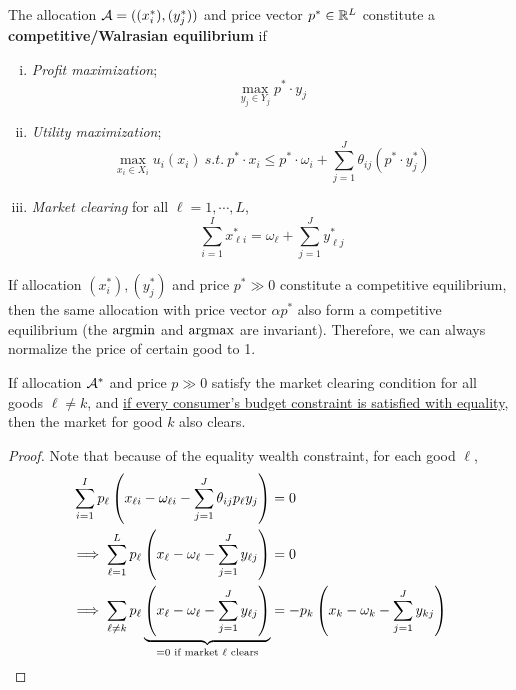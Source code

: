 \documentclass{article}
\begin{document}
	 	\begin{definition}[10.B.3]
	 		The allocation $\mathcal{{A}} = ((x_i^*), (y_j^*))$ and price vector $p^* \in \mathbb{R}^L$ constitute a \textbf{competitive/Walrasian equilibrium} if 
	 		\begin{enumerate}[(i)]
	 			\item \emph{Profit maximization};
		 			\begin{equation}
		 				\max_{y_j \in Y_j} p^* \cdot y_j
		 			\end{equation}
	 			\item \emph{Utility maximization};
	 				\begin{equation}
	 					\max_{x_i \in X_i} u_i(x_i)\ s.t.\ 
	 					p^* \cdot x_i \leq p^* \cdot \omega_i + \sum_{j=1}^J \theta_{ij} (p^* \cdot y^*_j)
	 				\end{equation}
	 			\item \emph{Market clearing} for all $\ell = 1, \cdots, L$,
	 				\begin{equation}
	 					\sum_{i=1}^I x^*_{\ell i} = \omega_\ell + \sum_{j=1}^J y^*_{\ell j}
	 				\end{equation}
	 		\end{enumerate}
	 	\end{definition}
	 	
	 	\begin{remark}
	 		If allocation $(x_i^*), (y_j^*)$ and price $p^* \gg 0$ constitute a competitive equilibrium, then the same allocation with price vector $\alpha p^*$ also form a competitive equilibrium (the $\operatorname*{argmin}$ and $\operatorname*{argmax}$ are invariant). Therefore, we can always normalize the price of certain good to 1.
	 	\end{remark}
	 	
	 	\begin{lemma}
	 		If allocation $\mathcal{{A}}^*$ and price $p \gg 0$ satisfy the market clearing condition for all goods $\ell \neq k$, and \ul{if every consumer's budget constraint is satisfied with equality}, then the market for good $k$ also clears.
	 	\end{lemma}
	 	
	 	\begin{proof}
	 		Note that because of the equality wealth constraint, for each good $\ell$, 
	 		\begin{align}
	 			\sum_{i=1}^I
	 				p_\ell \left( x_{\ell i} - \omega_{\ell i} - \sum_{j=1}^J \theta_{ij} p_\ell y_j
	 				\right ) &= 0
	 			\\ \implies 
	 			\sum_{\ell=1}^L p_\ell 
	 				\left (
	 					x_\ell - \omega_\ell - \sum_{j=1}^J y_{\ell j} 
	 				\right ) &= 0
	 			\\ \implies 
	 			\sum_{\ell \neq k} p_\ell 
	 				\underbrace{ \left (
	 					x_\ell - \omega_\ell - \sum_{j=1}^J y_{\ell j}
	 				\right ) }_{=0\text{{ if market $\ell$ clears}}}
	 				&= - p_k
	 				\left (
	 					x_k - \omega_k - \sum_{j=1}^J y_{k j}
	 				\right )
	 		\end{align}
	 	\end{proof}
	 	
\end{document}
